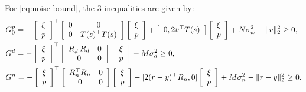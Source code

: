 \documentclass[11pt, onecolumn]{article}
\begin{document}
For \eqref{eq:noise-bound}, the 3 inequalities are given by:
\begin{align*}
&  G^p_0 =   - \left[ \begin{array}[c]{c} \xi\\ p \end{array} \right]^\top
  \left[ \begin{array}[c]{cc} 0  &0 \\ 0 & T(s)^\top T(s)   \end{array} \right]
  \left[ \begin{array}[c]{c} \xi \\p \end{array} \right]
  +  \left[ \begin{array}[c]{c c} 0, 2v^\top T(s) \end{array} \right]
  \left[ \begin{array}[c]{c} \xi  \\p \end{array} \right] + N\sigma_w^2 - \|v\|_2^2 \ge 0,
  \\
&  G^d = - \left[ \begin{array}[c]{c} \xi\\ p \end{array} \right]^\top
  \left[ \begin{array}[c]{cc} R_d^\top R_d  &0 \\ 0 & 0  \end{array} \right]
  \left[ \begin{array}[c]{c} \xi \\p \end{array} \right] +  M\sigma_d^2 \ge 0,
  \\
&  G^n =  - \left[ \begin{array}[c]{c} \xi\\ p \end{array} \right]^\top
  \left[ \begin{array}[c]{cc} R_n^\top R_n  & 0 \\ 0 & 0  \end{array} \right]
  \left[ \begin{array}[c]{c} \xi \\p \end{array} \right] -
  [ 2(r-y)^\top R_n, 0]    \left[ \begin{array}[c]{c} \xi  \\p \end{array} \right] + M\sigma_n^2  -
  \|r-y\|_2^2 \ge 0.
\end{align*}
\end{document}
